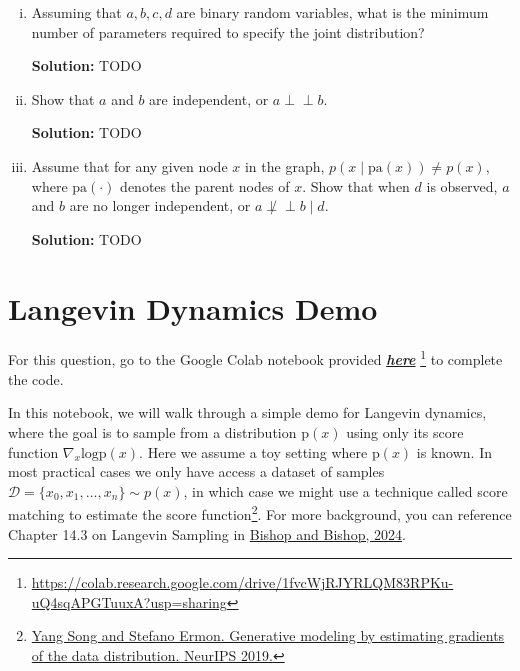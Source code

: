 \documentclass{article}
\newcommand{\Question}[1]{\Large \section{ #1 } \normalsize}
\newcommand{\statind}{\perp\!\!\!\perp}
\newenvironment{solution}{\color{blue} \smallskip \textbf{Solution:}}{}
\begin{document}
\begin{enumerate}[(a)]
\begin{enumerate}[(i)]
        \item 
        Assuming that $a, b, c, d$ are binary random variables, what is the minimum number of parameters required to specify the joint distribution?

        \begin{solution}
            TODO
        \end{solution}

        \item 
        Show that $a$ and $b$ are independent, or \(a \statind b\). 

        \begin{solution}
            TODO
        \end{solution}

        \item 
        Assume that for any given node $x$ in the graph, $p(x \mid \text{pa}(x)) \neq p(x)$, where $\text{pa}(\cdot)$ denotes the parent nodes of $x$. 
        Show that when $d$ is observed, $a$ and $b$ are no longer independent, or \(a \not\statind b \mid d\). 

        \begin{solution}
            TODO
        \end{solution}
    \end{enumerate}
\end{enumerate}


\newpage
\Question{Langevin Dynamics Demo}
\newcommand{\notebookurl}{https://colab.research.google.com/drive/1fvcWjRJYRLQM83RPKu-uQ4sqAPGTuuxA?usp=sharing} 

For this question, go to the Google Colab notebook provided \href{\notebookurl}{\textbf{\emph{here}}} \footnote{\href{\notebookurl}{\notebookurl}} to complete the code.

In this notebook, we will walk through a simple demo for Langevin dynamics, where the goal is to sample from a distribution $\text{p}(x)$ using only its score function $\nabla_x \text{log} \text{p}(x)$. 
Here we assume a toy setting where $\text{p}(x)$ is known. 
In most practical cases we only have access a dataset of samples $\mathcal{D} = \{x_0, x_1, \ldots, x_n\} \sim p(x)$, in which case we might use a technique called score matching to estimate the score function\footnote{\href{https://papers.neurips.cc/paper\_files/paper/2019/hash/3001ef257407d5a371a96dcd947c7d93-Abstract.html}{Yang Song and Stefano Ermon. Generative modeling by estimating gradients of the data distribution. NeurIPS 2019.}}. 
For more background, you can reference Chapter 14.3 on Langevin Sampling in \href{https://www.bishopbook.com}{Bishop and Bishop, 2024}.
\end{document}
